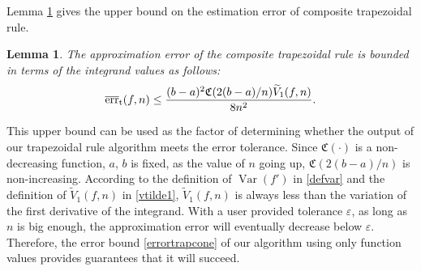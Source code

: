 \documentclass{iitthesis}
\DeclareMathOperator{\Var}{Var}
\newtheorem{lem}{Lemma}
\theoremstyle{definition}
\theoremstyle{remark}
\begin{document}
Lemma \ref{lemmaerrorboundtrap} gives the upper bound on the estimation error of composite trapezoidal rule.
\begin{lem}\label{lemmaerrorboundtrap}
    The approximation error of the composite trapezoidal rule is bounded in terms of the integrand values as follows:
    \begin{equation}\label{errortrapcone}
      \overline{\textup{err}}_{\textup{t}}(f,n)\leq \frac{(b-a)^2\mathfrak{C}(2(b-a)/n)\widetilde{V}_1(f,n)}{8n^2}.
    \end{equation}
\end{lem}

This upper bound can be used as the factor of determining whether the output of our trapezoidal rule algorithm meets the error tolerance. Since $\mathfrak{C}(\cdot)$ is a non-decreasing function, $a$, $b$ is fixed, as the value of $n$ going up, $\mathfrak{C}(2(b-a)/n)$ is non-increasing. According to the definition of $\Var(f')$ in \eqref{defvar} and the definition of $\widetilde{V}_1(f,n)$ in \eqref{vtilde1}, $\widetilde{V}_1(f,n)$ is always less than the variation of the first derivative of the integrand. With a user provided tolerance $\varepsilon$, as long as $n$ is big enough, the approximation error will eventually decrease below $\varepsilon$. Therefore, the error bound \eqref{errortrapcone} of our algorithm using only function values provides guarantees that it will succeed.

\end{document}
